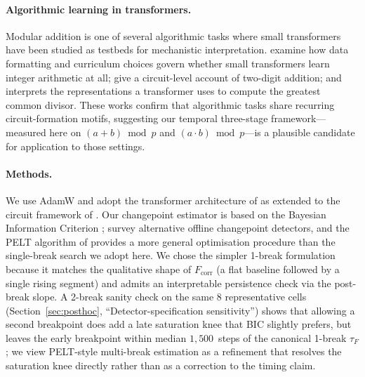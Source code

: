 \documentclass{article}
\newcommand{\tauf}{\tau_{F}}
\newcommand{\fcorr}{F_{\mathrm{corr}}}
\begin{document}
\paragraph{Algorithmic learning in transformers.}
Modular addition is one of several algorithmic tasks where
small transformers have been studied as testbeds for
mechanistic interpretation.
\citet{lee2024teaching} examine how data formatting and curriculum
choices govern whether small transformers learn integer arithmetic
at all; \citet{quirke2024understanding} give a circuit-level account
of two-digit addition; and \citet{charton2023learning} interprets
the representations a transformer uses to compute the greatest common
divisor.
These works confirm that algorithmic tasks share recurring
circuit-formation motifs, suggesting our temporal three-stage
framework---measured here on $(a+b)\bmod p$ and $(a\cdot b)\bmod p$---is
a plausible candidate for application to those settings.

\paragraph{Methods.}
We use AdamW \citep{loshchilov2019decoupled} and adopt the
transformer architecture of \citet{vaswani2017attention} as
extended to the circuit framework of \citet{elhage2021mathematical}.
Our changepoint estimator is based on the Bayesian Information
Criterion \citep{schwarz1978estimating};
\citet{truong2020selective} survey alternative offline changepoint
detectors, and the PELT algorithm of \citet{killick2012optimal}
provides a more general optimisation procedure than the single-break
search we adopt here.
We chose the simpler 1-break formulation because it matches
the qualitative shape of $\fcorr$ (a flat baseline followed by a
single rising segment) and admits an interpretable persistence
check via the post-break slope.
A 2-break sanity check on the same 8 representative cells
(Section~\ref{sec:posthoc}, ``Detector-specification sensitivity'')
shows that allowing a second breakpoint does add a late
saturation knee that BIC slightly prefers, but leaves the early
breakpoint within median $1{,}500$~steps of the canonical
1-break $\tauf$; we view PELT-style multi-break estimation as a
refinement that resolves the saturation knee directly rather
than as a correction to the timing claim.
\end{document}
